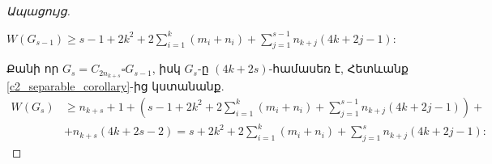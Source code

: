\begin{hide}
\begin{proof}[Ապացույց]
\begin{center}
$W(G_{s-1}) \geq s-1 + 2k^2 + 2\sum\limits_{i=1}^{k}{\left(m_i+n_i\right)} + \sum\limits_{j=1}^{s-1}{n_{k+j}(4k+2j-1)}$:
\end{center}
Քանի որ $G_s = C_{2n_{k+s}} \square G_{s-1}$, իսկ $G_s$-ը $(4k+2s)$-համասեռ է, Հետևանք \ref{c2_separable_corollary}-ից կստանանք.
\begin{align*}
W(G_s) &\geq n_{k+s} + 1 + \left(s-1 + 2k^2 + 2\sum\limits_{i=1}^{k}{\left(m_i+n_i\right)} + \sum\limits_{j=1}^{s-1}{n_{k+j}(4k+2j-1)}\right) +\\
& + n_{k+s}(4k+2s-2) = s + 2k^2 + 2\sum\limits_{i=1}^{k}{\left(m_i+n_i\right)} + \sum\limits_{j=1}^{s}{n_{k+j}(4k+2j-1)}:
\end{align*}
\end{proof}
\end{hide}